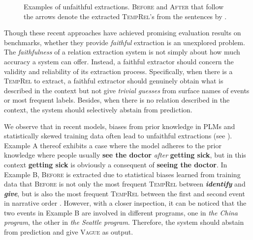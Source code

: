 \documentclass[11pt]{article}
\newcommand{\temprel}{\textsc{TempRel}\xspace}
\begin{document}
\begin{figure}[t]
\begin{minipage}{\linewidth}
\noindent
{}
\vspace{-0.5em}
    \caption{Examples of unfaithful extractions. \textsc{Before} and \textsc{After} that follow the arrows denote the extracted \temprel's from the sentences by \cite{zhou-etal-2021-temporal}.}\label{fig:example}
    \vspace{-0.5em}
\end{minipage}
\end{figure}

Though these recent approaches have achieved promising evaluation results on benchmarks, 
whether they provide \emph{faithful} extraction is an unexplored problem.
The \emph{faithfulness} of a relation extraction system is not simply about how much accuracy a system can offer.
Instead, a faithful extractor should concern the validity and reliability of its extraction process. 
Specifically, when there is a \temprel to extract, a faithful extractor should genuinely obtain what is described in the context but not give \emph{trivial guesses} from surface names of events or most frequent labels.
Besides, when there is no relation described in the context, the system should selectively abstain from prediction.


We observe that in recent models, biases from prior knowledge in PLMs and statistically skewed training data often lead to unfaithful extractions (see ).
Example A thereof exhibits a case where the model adheres to the prior knowledge where people usually \textbf{see the doctor} \emph{after} \textbf{getting sick}, but in this context \textbf{getting sick} is obviously a consequent of \textbf{seeing the doctor}. 
In Example B, \textsc{Before} is extracted due to statistical biases learned from training data that \textsc{Before} is not only the most frequent \temprel between \textbf{\textit{identify}} and \textbf{\textit{give}},
but is also the most frequent \temprel between the first and second event in narrative order \cite{gee1984empirical}.
However, with a closer inspection, it can be noticed that the two events in Example B are involved in different programs, one in \textit{the China program}, the other in \textit{the Seattle program}.
Therefore, the system should abstain from prediction and give \textsc{Vague} as output.
\end{document}

